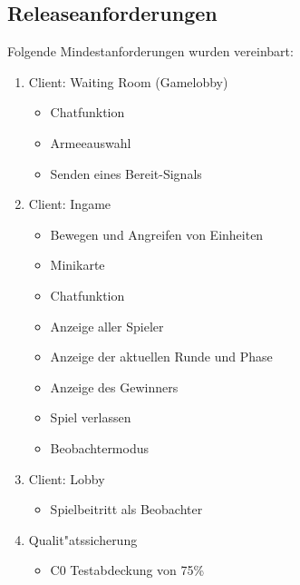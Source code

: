 \documentclass[12pt, titlepage]{scrartcl}
\begin{document}
        \subsection{Releaseanforderungen} \label{FEATURE_REQUESTS}
            Folgende Mindestanforderungen wurden vereinbart:
            \begin{enumerate}
                \item Client: Waiting Room (Gamelobby)
                \begin{itemize}
                    \item Chatfunktion
                    \item Armeeauswahl
                    \item Senden eines Bereit-Signals
                \end{itemize}
                \item Client: Ingame
                \begin{itemize}
                    \item Bewegen und Angreifen von Einheiten
                    \item Minikarte
                    \item Chatfunktion
                    \item Anzeige aller Spieler
                    \item Anzeige der aktuellen Runde und Phase
                    \item Anzeige des Gewinners
 					\item Spiel verlassen
			\item Beobachtermodus
                \end{itemize}
                \item Client: Lobby
                \begin{itemize}
                    \item Spielbeitritt als Beobachter
                \end{itemize}
                \item Qualit"atssicherung
                \begin{itemize}
                    \item C0 Testabdeckung von 75\%
                \end{itemize}
            \end{enumerate}
\end{document}
